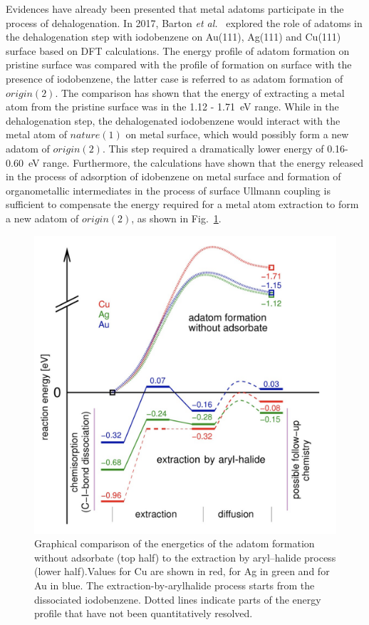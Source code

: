 \documentclass[%
 reprint,
 amsmath,amssymb,
 aps,
prb,
]{revtex4-1}
\begin{document}
Evidences have already been presented that metal adatoms participate in the process of dehalogenation. 
In 2017, Barton \textit{et al.}~\cite{chemeurope2017} explored the role of adatoms in the dehalogenation step with iodobenzene on Au(111), Ag(111) and Cu(111) surface based on DFT calculations. The energy profile of adatom formation on pristine surface was compared with the profile of formation on surface with the presence of iodobenzene, the latter case is referred to as adatom formation of $origin(2)$. The comparison has shown that the energy of extracting a metal atom from the pristine surface was in the 1.12 - 1.71~eV range. While in the dehalogenation step, the dehalogenated iodobenzene would interact with the metal atom of $nature(1)$ on metal surface, which would possibly form a new adatom of $origin(2)$. This step required a dramatically lower energy of 0.16-0.60~eV range. Furthermore, the calculations have shown that the energy released in the process of adsorption of idobenzene on metal surface and formation of organometallic intermediates in the process of surface Ullmann coupling is sufficient to compensate the energy required for a metal atom extraction to form a new adatom of $origin(2)$, as shown in Fig.~\ref{fig:3}.
\begin{figure}[htb]
\centering
\includegraphics[width=0.75\columnwidth]{Fig/Adatom-formation.png}
\caption{Graphical comparison of the energetics of the adatom formation without adsorbate (top half) to the extraction by aryl–halide process (lower half).Values for Cu are shown in red, for Ag in green and for Au in blue. The extraction-by-arylhalide process starts from the dissociated iodobenzene. Dotted lines indicate parts of the energy profile that have not been quantitatively resolved.}
\label{fig:3}
\end{figure}
\end{document}
